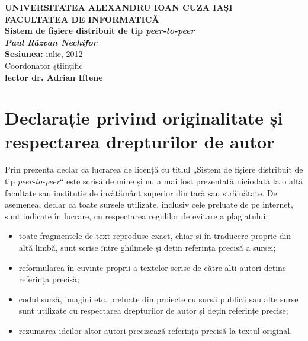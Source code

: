 \documentclass[a4wide,12pt]{report}
\newcommand{\eng}[1]{\emph{#1}} %
\newcommand{\titlu}{Sistem de fișiere distribuit de tip \eng{peer-to-peer}}
\newcommand{\autor}{Paul Răzvan Nechifor} %
\newcommand{\coordonator}{lector dr. Adrian Iftene}
\newcommand{\sesiunea}{iulie, 2012}
\begin{document}
\begin{center}
    \textbf{UNIVERSITATEA ALEXANDRU IOAN CUZA IAȘI}\\
    \vspace{3mm}
    \textbf{FACULTATEA DE INFORMATICĂ}\\
    \vspace{89mm}
    \Huge{\textbf{\titlu}}\\
    \vspace{30mm}
    \Large{\textbf{\emph{\autor}}}\\
    \vspace{11mm}
    \Large{\textbf{Sesiunea:} \sesiunea}\\
    \vspace{10mm}
    \normalsize{Coordonator științific}\\
    \vspace{3mm}
    \large{\textbf{\coordonator}}\\
    \end{center}
\pagebreak

\section*{Declarație privind originalitate și respectarea drepturilor de autor} %

Prin prezenta declar că lucrarea de licență cu titlul „\titlu“ este scrisă de mine și nu a mai fost prezentată
niciodată la o altă facultate sau instituție de învățământ superior din țară sau străinătate. De asemenea, declar că
toate sursele utilizate, inclusiv cele preluate de pe internet, sunt indicate în lucrare, cu respectarea regulilor de
evitare a plagiatului:

\begin{itemize}
    \item toate fragmentele de text reproduse exact, chiar și în traducere proprie din altă limbă, sunt scrise între
    ghilimele și dețin referința precisă a sursei;
    \item reformularea în cuvinte proprii a textelor scrise de către alți autori deține referința precisă;
    \item codul sursă, imagini etc. preluate din proiecte cu sursă publică sau alte surse sunt utilizate cu respectarea
    drepturilor de autor și dețin referințe precise;
    \item rezumarea ideilor altor autori precizează referința precisă la textul original.
\end{itemize}
\end{document}
